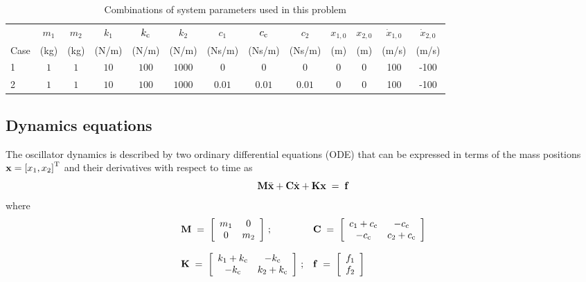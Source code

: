 \documentclass[fleqn,11pt]{article}
\renewcommand{\arraystretch}{1.136}
\newcommand{\sqbr}[1]		{ \left[ #1 \right] }
\newcommand{\cvvect}[1]		{ \begin{array}{c} #1 \end{array} }
\newcommand{\matr}[2]		{ \begin{array}{ #1 } #2 \end{array} }
\newcommand{\trans}			{^{\rm T}}
\newcommand{\eq}			{ \; = \; }
\begin{document}
\begin{table}[ht]
\begin{center}	
	{ \footnotesize{
			\renewcommand{\arraystretch}{1.25}
			\begin{tabular}{lcccccccccccc}
				\hline
				& $m_1$ 	& $m_2$ 	&$k_1$ & $k_{\rm c}$  &$k_2$ &$c_1$ & $c_{\rm c}$ &$c_2$ 
				&$x_{1,0}$ 	&$x_{2,0}$	&$\dot{x}_{1,0}$ 	&$\dot{x}_{2,0}$	\\
				Case	& (kg)		& (kg)	&(N/m) &(N/m) 	&(N/m) &(Ns/m) &(Ns/m) &(Ns/m)  
				& (m) 		& (m)	&(m/s) &(m/s)\\
				\hline
				1	& $1$ 	& $1$ 	& $10$ & $100$ & $1000$ &0 &0 &0 &0 &0 &100 &-100 \\
				2	& $1$ 	& $1$ 	& $10$ & $100$ & $1000$ &$0.01$ &$0.01$ &$0.01$ &0 &0 &100 &-100 \\
				\hline
			\end{tabular}
	}}
\end{center}
\caption{Combinations of system parameters used in this problem}
\label{tab:systemParameters}
\end{table}


\subsection{Dynamics equations}
\label{DynEquations}

The oscillator dynamics is described by two ordinary differential equations (ODE) that can be expressed in terms of the mass positions ${\bf x} = \sqbr{x_1, x_2}\trans$ and their derivatives with respect to time as
%
\begin{equation}
	{\bf M}\ddot{\bf x} + {\bf C}\dot{\bf x} + {\bf K}{\bf x} \eq {\bf f}
	\label{eq:linearOscillatorDynEqsCompact}
\end{equation}
%
where
%
\begin{equation}
	\matr{ll}
	{
	{\bf M} \eq \sqbr{\matr{cc}{m_1 &0 \\ 0 &m_2}}\,;
	&{\bf C} \eq \sqbr{\matr{cc}{c_1 + c_{\rm c} &-c_{\rm c} \\ -c_{\rm c} &c_2 + c_{\rm c}}} 
	\\
	\\ 
	{\bf K} \eq \sqbr{\matr{cc}{k_1 + k_{\rm c} &-k_{\rm c} \\ -k_{\rm c} &k_2 + k_{\rm c}}}\,;
	& {\bf f} \eq \sqbr{\cvvect{f_1 \\ f_2}} 
	}
	\label{eq:linearOscillatorDynEqsTerms}
\end{equation}
%
\end{document}
